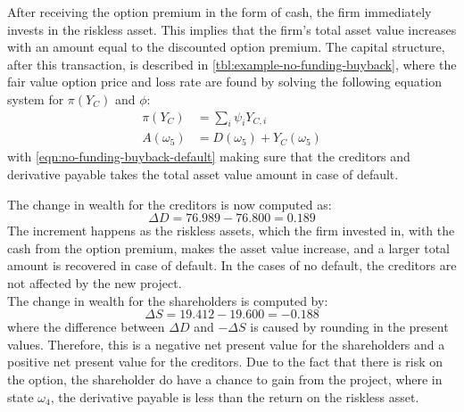 \documentclass[../main.tex]{subfiles}
\begin{document}
            After receiving the option premium in the form of cash, the firm immediately invests in the riskless asset. 
            This implies that the firm's total asset value increases with an amount equal to the discounted option premium. 
            The capital structure, after this transaction, is described in \cref{tbl:example-no-funding-buyback}, 
            where the fair value option price and loss rate are found
            by solving the following equation system for $\pi(Y_C)$ and $\phi$:
            \begin{align}
                \pi(Y_C) &= \sum_i \psi_i Y_{C,i}\\
                A(\omega_5) &= D(\omega_5) + Y_C(\omega_5)
                \label{eqn:no-funding-buyback-default}
            \end{align}
            with \cref{eqn:no-funding-buyback-default} making sure that the creditors and derivative payable
            takes the total asset value amount in case of default.

            The change in wealth for the creditors is now computed as:
            \begin{equation}
                \Delta D = 76.989 - 76.800 = 0.189
            \end{equation}
            The increment happens as the riskless assets, which the firm invested in, with the cash from the option premium, 
            makes the asset value increase, and a larger total amount is recovered in case of default. 
            In the cases of no default, the creditors are not affected by the new project.\\
            The change in wealth for the shareholders is computed by:
            \begin{equation}
                \Delta S = 19.412 - 19.600 = -0.188
            \end{equation}
            where the difference between $\Delta D$ and $-\Delta S$ is caused by rounding in the present values. 
            Therefore, this is a negative net present value for the shareholders 
            and a positive net present value for the creditors. 
            Due to the fact that there is risk on the option, the shareholder do have a chance to gain from the project, 
            where in state $\omega_4$, the derivative payable is less than the return on the riskless asset.
\end{document}
